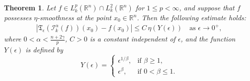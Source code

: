 \documentclass[11pt,a4paper,reqno]{amsproc}
\newtheorem{theorem}{Theorem}[section]
\theoremstyle{definition}
\theoremstyle{remark}
\numberwithin{equation}{section}
\begin{document}
\begin{theorem}\label{Riez-R-of-C}
Let \( f \in L_k^p(\mathbb{R}^n) \cap L_k^2(\mathbb{R}^n) \) for \( 1 \leq p < \infty \), and suppose that \( f \) possesses \(\eta\)-smoothness at the point \( x_0 \in \mathbb{R}^n \). Then the following estimate holds:
\begin{align*}
    \left| \mathfrak{T}_\epsilon(\mathcal{I}_k^{\alpha}(f))(x_0)- f(x_0) \right| \leq C\,\eta(Y(\epsilon)) \quad \text{as } \epsilon \to 0^+,
\end{align*}
where \( 0 < \alpha < \frac{n+2\gamma}{p} \), \( C>0\) is a constant independent of \( \epsilon\), and the function \( Y(\epsilon) \) is defined by
\begin{equation*}
     Y(\epsilon) =   
\begin{cases} 
  \epsilon^{1/\beta}, & \text{if } \beta \geq 1, \\ 
  \epsilon^{\beta},   & \text{if } 0 < \beta \leq 1.
\end{cases}
\end{equation*}
\end{theorem}
\end{document}
